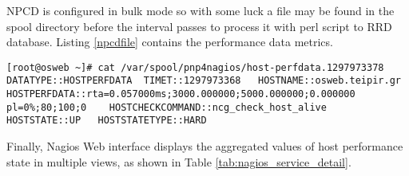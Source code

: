 NPCD is configured in bulk mode so with some luck a file may be found in the spool directory before the interval passes to process it with perl script to RRD database. Listing \ref{npcdfile} contains the performance data metrics.

\begin{lstlisting}[caption=NPCD temporary file in spool directory,label=npcdfile]
[root@osweb ~]# cat /var/spool/pnp4nagios/host-perfdata.1297973378 
DATATYPE::HOSTPERFDATA	TIMET::1297973368	HOSTNAME::osweb.teipir.gr	HOSTPERFDATA::rta=0.057000ms;3000.000000;5000.000000;0.000000 pl=0%;80;100;0	HOSTCHECKCOMMAND::ncg_check_host_alive	HOSTSTATE::UP	HOSTSTATETYPE::HARD
\end{lstlisting}

Finally, Nagios Web interface displays the aggregated values of host performance state in multiple views, as shown in Table \ref{tab:nagios_service_detail}.

\begin{table}[ht]
\small\addtolength{\tabcolsep}{-3pt}
\caption{Example Nagios service status details for ganglia check}
\label{tab:nagios_service_detail}
\end{table}

